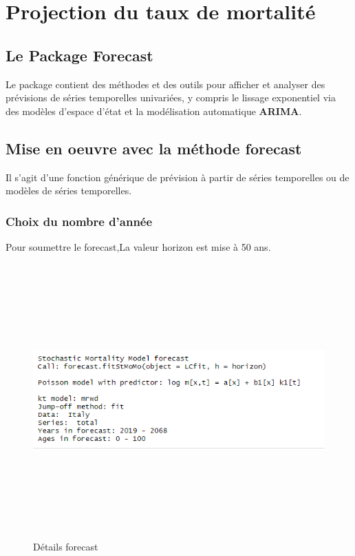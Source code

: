 \documentclass[french]{report}
\begin{document}
\section{Projection du taux de mortalité}
\subsection{Le Package Forecast}
Le package contient des méthodes et des outils pour afficher et analyser des prévisions de séries temporelles univariées, y compris le lissage exponentiel via des modèles d'espace d'état et la modélisation automatique \textbf{ARIMA}. \cite{package forecast}


\subsection{Mise en oeuvre avec la méthode forecast}
Il s'agit d'une fonction générique de prévision à partir de séries temporelles ou de modèles de séries temporelles.
\subsubsection{Choix du nombre d'année}
Pour soumettre le forecast,La valeur horizon est mise à 50 ans.

\begin{figure}[hhhhhhhh!]
    \centering
    \includegraphics[width=14cm, height=10.5cm]{forecast_details.png}
    \caption{ Détails forecast }
    \label{fig:prediction1.png}
\end{figure}
\end{document}
